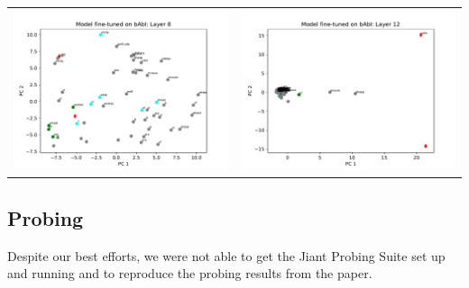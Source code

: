 \documentclass{article}
\begin{document}
	\begin{center}
		\begin{tabular}{ c c }
			\includegraphics[scale=0.4]{../badges/reproduced/visualization/babi/model-fine-tuned-on-babi--layer-8.pdf} &
			\includegraphics[scale=0.4]{../badges/reproduced/visualization/babi/model-fine-tuned-on-babi--layer-12.pdf}
		\end{tabular}
	\end{center}

	\subsection{Probing}
	Despite our best efforts, we were not able to get the Jiant Probing Suite set up and running and to reproduce the probing results from the paper. \\
	
\end{document}
